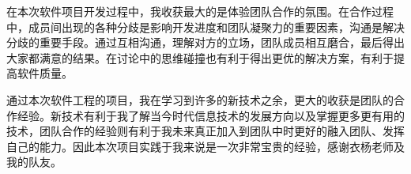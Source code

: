 \begin{itemize}
  \CJKindent 在本次软件项目开发过程中，我收获最大的是体验团队合作的氛围。在合作过程中，成员间出现的各种分歧是影响开发进度和团队凝聚力的重要因素，沟通是解决分歧的重要手段。通过互相沟通，理解对方的立场，团队成员相互磨合，最后得出大家都满意的结果。在讨论中的思维碰撞也有利于得出更优的解决方案，有利于提高软件质量。
  
  \CJKindent 通过本次软件工程的项目，我在学习到许多的新技术之余，更大的收获是团队的合作经验。新技术有利于我了解当今时代信息技术的发展方向以及掌握更多更有用的技术，团队合作的经验则有利于我未来真正加入到团队中时更好的融入团队、发挥自己的能力。因此本次项目实践于我来说是一次非常宝贵的经验，感谢衣杨老师及我的队友。

\end{itemize}
